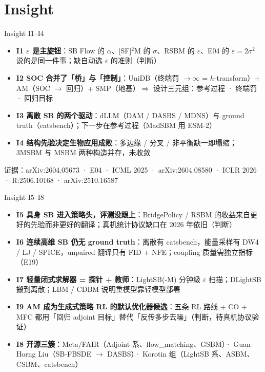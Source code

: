 \documentclass[aspectratio=169,10pt]{beamer}
\begin{document}
\section{Insight}
\begin{frame}{Insight I1--I4}
\begin{itemize}
\item \textbf{I1 $\varepsilon$ 是主旋钮}：SB Flow 的 $\alpha$、[SF]$^2$M 的 $\sigma$、RSBM 的 $\varepsilon$、E04 的 $\varepsilon=2\sigma^2$ 说的是同一件事；缺自动选 $\varepsilon$ 的准则（判断）
\item \textbf{I2 SOC 合并了「桥」与「控制」}：UniDB（终端罚 $\to\infty$ = $h$-transform）+ AM（SOC $\to$ 回归）+ SMP（地基）$\Rightarrow$ 设计三元组：参考过程 · 终端罚 · 回归目标
\item \textbf{I3 离散 SB 的两个驱动}：dLLM（DAM / DASBS / MDNS）与 ground truth（catsbench）；下一步在参考过程（MadSBM 用 ESM-2）
\item \textbf{I4 结构先验决定生物应用成败}：多边缘 / 分叉 / 非平衡缺一即塌缩；3MSBM 与 MSBM 两种构造并存，未收敛
\end{itemize}
\vspace{4pt}
{\small 证据：arXiv:2604.05673 · E04 · ICML 2025 · arXiv:2604.08580 · ICLR 2026 · R:2506.10168 · arXiv:2510.16587}
\end{frame}

\begin{frame}{Insight I5--I8}
\begin{itemize}
\item \textbf{I5 具身 SB 进入策略头，评测没跟上}：BridgePolicy / RSBM 的收益来自更好的先验而非更好的翻译；真机统计协议缺口在 2026 年依旧（判断）
\item \textbf{I6 连续高维 SB 仍无 ground truth}：离散有 catsbench，能量采样有 DW4 / LJ / SPICE，unpaired 翻译只有 FID + NFE；coupling 质量需独立指标（E19）
\item \textbf{I7 轻量闭式求解器 = 探针 + 教师}：LightSB(-M) 分钟级 $\varepsilon$ 扫描；DLightSB 搬到离散；LBM / CDBM 说明重模型靠轻模型部署
\item \textbf{I9 AM 成为生成式策略 RL 的默认优化器候选}：五条 RL 路线 + CO + MFC 都用「回归 adjoint 目标」替代「反传多步去噪」（判断，待真机协议验证）
\item \textbf{I8 开源三簇}：Meta/FAIR（Adjoint 系、flow\_matching、GSBM）· Guan-Horng Liu（SB-FBSDE $\to$ DASBS）· Korotin 组（LightSB 系、ASBM、CSBM、catsbench）
\end{itemize}
\end{frame}
\end{document}
